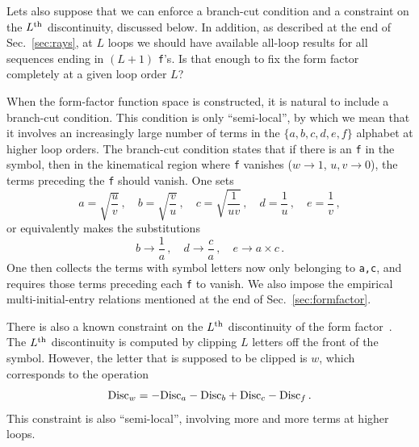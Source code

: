 \documentclass[12pt]{article}
\begin{document}
Lets also suppose that we can enforce a branch-cut condition and a constraint on the $L^{\rm th}$ discontinuity, discussed below.  In addition, as described at the end of Sec.~\ref{sec:rays}, at $L$ loops we should have available all-loop results for all sequences ending in $(L+1)$ {\tt f}'s.  Is that enough to fix the form factor completely at a given loop order $L$?  

When the form-factor function space is constructed, it is natural to include a branch-cut condition.  This condition is only ``semi-local'', by which we mean that it involves an increasingly large number of terms in the $\{a,b,c,d,e,f\}$ alphabet at higher loop orders.  The branch-cut condition states that if there is an {\tt f} in the symbol, then in the kinematical region where {\tt f} vanishes ($w\to1$, $u,v\to0$), the terms preceding the {\tt f} should vanish. One sets
%
\begin{equation}
a = \sqrt{\frac{u}{v}} \,, \quad 
b = \sqrt{\frac{v}{u}} \,, \quad
c = \sqrt{\frac{1}{uv}} \,, \quad
d = \frac{1}{u} \,, \quad
e = \frac{1}{v} \,,
\end{equation}
%
or equivalently makes the substitutions
%
\begin{equation} 
b \rightarrow \frac{1}{a} \,, \quad
d \rightarrow \frac{c}{a} \,, \quad
e \rightarrow a\times c \,.
\end{equation}
%
One then collects the terms with symbol letters now only belonging to {\tt a,c},
and requires those terms preceding each {\tt f} to vanish.  We also impose the empirical multi-initial-entry relations mentioned at the end of Sec.~\ref{sec:formfactor}.

There is also a known constraint on the $L^{\rm th}$ discontinuity of the form factor~\citep{Dixon:2022rse}.  The $L^{\rm th}$ discontinuity is computed by clipping $L$ letters off the front of the symbol.  However, the letter that is supposed to be clipped is $w$, which corresponds to the operation
%
\begin{equation}
    {\rm Disc}_w = - {\rm Disc}_a - {\rm Disc}_b + {\rm Disc}_c - {\rm Disc}_f \,.
\end{equation}
%
This constraint is also ``semi-local'', involving more and more terms at higher loops.
\end{document}
